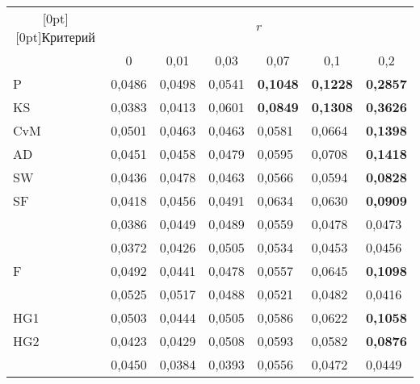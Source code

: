 \begin{table*}\small %
\begin{center}
\vspace*{2ex}

\begin{tabular}{|l|l|l|l|l|l|l|}
\hline
\multicolumn{1}{|c|}{\raisebox{-6pt}[0pt][0pt]{Критерий}}& \multicolumn{6}{c|}{$r$}\\
\cline{2-7}
&\multicolumn{1}{c|}{0}&\multicolumn{1}{c|}{0,01}&
\multicolumn{1}{c|}{0,03}&\multicolumn{1}{c|}{0,07}&\multicolumn{1}{c|}{0,1}&\multicolumn{1}{c|}{0,2}\\
\hline
\hspace*{4mm}P&0,0486&0,0498&0,0541&{\bf 0,1048}&{\bf 0,1228}&{\bf 0,2857}\\
\hspace*{4mm}KS&0,0383&0,0413&0,0601&{\bf 0,0849}&{\bf 0,1308}&{\bf 0,3626}\\
\hspace*{4mm}CvM&0,0501&0,0463&0,0463&0,0581&0,0664&{\bf 0,1398}\\
\hspace*{4mm}AD&0,0451&0,0458&0,0479&0,0595&0,0708&{\bf 0,1418}\\
\hspace*{4mm}SW&0,0436&0,0478&0,0463&0,0566&0,0594&{\bf 0,0828}\\
\hspace*{4mm}SF&0,0418&0,0456&0,0491&0,0634&0,0630&{\bf 0,0909}\\
\hspace*{4mm}{\bf JB}&0,0386&0,0449&0,0489&0,0559&0,0478&0,0473\\
\hspace*{4mm}{\bf AJB}&0,0372&0,0426&0,0505&0,0534&0,0453&0,0456\\
\hspace*{4mm}F&0,0492&0,0441&0,0478&0,0557&0,0645&{\bf 0,1098}\\
\hspace*{4mm}{\bf G}&0,0525&0,0517&0,0488&0,0521&0,0482&0,0416\\
\hspace*{4mm}HG1&0,0503&0,0444&0,0505&0,0586&0,0622&{\bf 0,1058}\\
\hspace*{4mm}HG2&0,0423&0,0429&0,0508&0,0593&0,0582&{\bf 0,0876}\\
\hspace*{4mm}{\bf K}&0,0450&0,0384&0,0393&0,0556&0,0472&0,0449\\

\end{tabular}
\end{center}
\end{table*}
